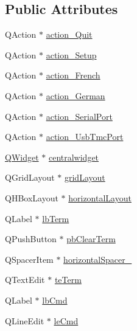 \subsection*{Public Attributes}
\begin{DoxyCompactItemize}
\item 
Q\-Action $\ast$ \hyperlink{class_ui__mdt_port_term_ad9a01522f2629a8065162cb27afdf474}{action\-\_\-\-Quit}
\item 
Q\-Action $\ast$ \hyperlink{class_ui__mdt_port_term_a0c4f0edb985974b0caad1a02d7f8199e}{action\-\_\-\-Setup}
\item 
Q\-Action $\ast$ \hyperlink{class_ui__mdt_port_term_a6ddfea8f9e535724a12321de6e3667c2}{action\-\_\-\-French}
\item 
Q\-Action $\ast$ \hyperlink{class_ui__mdt_port_term_ae7d374eafa1b37726d80ee9afae84139}{action\-\_\-\-German}
\item 
Q\-Action $\ast$ \hyperlink{class_ui__mdt_port_term_ab0c5b1851589dec225e7e7ba431fd6d8}{action\-\_\-\-Serial\-Port}
\item 
Q\-Action $\ast$ \hyperlink{class_ui__mdt_port_term_abbc97780b7856e9effb0c1452fef55dc}{action\-\_\-\-Usb\-Tmc\-Port}
\item 
\hyperlink{class_q_widget}{Q\-Widget} $\ast$ \hyperlink{class_ui__mdt_port_term_af8899e8012439f2b421c0e9bb5f57531}{centralwidget}
\item 
Q\-Grid\-Layout $\ast$ \hyperlink{class_ui__mdt_port_term_a4bb113c1e6994b9d0e0346a7a7525b9a}{grid\-Layout}
\item 
Q\-H\-Box\-Layout $\ast$ \hyperlink{class_ui__mdt_port_term_a550d695251cf000d6de78344601809a2}{horizontal\-Layout}
\item 
Q\-Label $\ast$ \hyperlink{class_ui__mdt_port_term_a9fe35feb5504ff573d5fa61f81b7e3da}{lb\-Term}
\item 
Q\-Push\-Button $\ast$ \hyperlink{class_ui__mdt_port_term_a4e5afb56bed669a17b535b33f86d7503}{pb\-Clear\-Term}
\item 
Q\-Spacer\-Item $\ast$ \hyperlink{class_ui__mdt_port_term_a3187cf956072cfa3c15fb7d5d0bd93ad}{horizontal\-Spacer\-\_}
\item 
Q\-Text\-Edit $\ast$ \hyperlink{class_ui__mdt_port_term_aa4f5b47fb9c324397b9608af1c6e6967}{te\-Term}
\item 
Q\-Label $\ast$ \hyperlink{class_ui__mdt_port_term_ab0b157b2e4d7916fdca147efb61616d5}{lb\-Cmd}
\item 
Q\-Line\-Edit $\ast$ \hyperlink{class_ui__mdt_port_term_abd502c5675bd636af95e9cdb6f5e2680}{le\-Cmd}

\end{DoxyCompactItemize}
